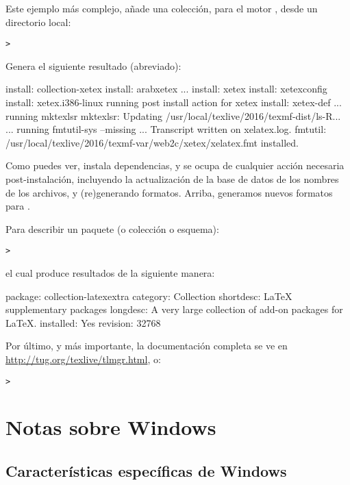 \documentclass{article}
\begin{document}
Este ejemplo más complejo, añade una colección, para el motor \XeTeX,
desde un directorio local:

\begin{alltt}
> 
\end{alltt}
Genera el siguiente resultado (abreviado):
\begin{fverbatim}
install: collection-xetex
install: arabxetex
...
install: xetex
install: xetexconfig
install: xetex.i386-linux
running post install action for xetex
install: xetex-def
...
running mktexlsr
mktexlsr: Updating /usr/local/texlive/2016/texmf-dist/ls-R...
...
running fmtutil-sys --missing
...
Transcript written on xelatex.log.
fmtutil: /usr/local/texlive/2016/texmf-var/web2c/xetex/xelatex.fmt installed.
\end{fverbatim}

Como puedes ver,  instala dependencias, y se ocupa de
cualquier acción necesaria post-instalación, incluyendo la
actualización de la base de datos de los nombres de los archivos, y
(re)generando formatos. Arriba, generamos nuevos formatos para \XeTeX.

Para describir un paquete (o colección o esquema):
\begin{alltt}
> 
\end{alltt}
el cual produce resultados de la siguiente manera:
\begin{fverbatim}
package:    collection-latexextra
category:   Collection
shortdesc:  LaTeX supplementary packages
longdesc:   A very large collection of add-on packages for LaTeX.
installed:  Yes
revision:   32768
\end{fverbatim}

Por último, y más importante, la documentación completa se ve en
\url{http://tug.org/texlive/tlmgr.html}, o:
\begin{alltt}
> 
\end{alltt}

\section{Notas sobre Windows}
\label{sec:windows}

\subsection{Características específicas de Windows}
\label{sec:winfeatures}
\end{document}
